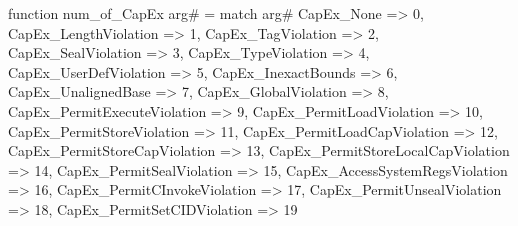 function num_of_CapEx arg# = match arg# {
  CapEx_None => 0,
  CapEx_LengthViolation => 1,
  CapEx_TagViolation => 2,
  CapEx_SealViolation => 3,
  CapEx_TypeViolation => 4,
  CapEx_UserDefViolation => 5,
  CapEx_InexactBounds => 6,
  CapEx_UnalignedBase => 7,
  CapEx_GlobalViolation => 8,
  CapEx_PermitExecuteViolation => 9,
  CapEx_PermitLoadViolation => 10,
  CapEx_PermitStoreViolation => 11,
  CapEx_PermitLoadCapViolation => 12,
  CapEx_PermitStoreCapViolation => 13,
  CapEx_PermitStoreLocalCapViolation => 14,
  CapEx_PermitSealViolation => 15,
  CapEx_AccessSystemRegsViolation => 16,
  CapEx_PermitCInvokeViolation => 17,
  CapEx_PermitUnsealViolation => 18,
  CapEx_PermitSetCIDViolation => 19
}
